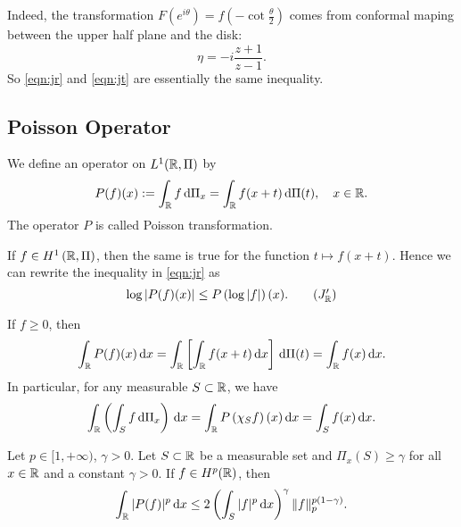 \begin{remark}
	Indeed, the transformation $\displaystyle F(e^{i\theta })=f\left( -\cot \frac{\theta }{2} \right) $ comes from conformal maping between the upper half plane and the disk:
	\[
	\eta = -i \frac{z+1}{z-1}.
	\]
	So \cref{eqn:jr} and \cref{eqn:jt} are essentially the same inequality.
\end{remark}

\subsection{Poisson Operator}
	We define an operator on $L^1(\mathbb{R},\Pi)$ by
	\[
	P(f)(x):=\int_{\mathbb{R}}f\,\mathrm{d} \Pi_x=\int_{\mathbb{R}}f(x+t)\,\mathrm{d} \Pi(t),\quad x\in \mathbb{R}.
	\] 
	The operator $P$ is called Poisson transformation.


If $f\in H^{1}\left( \mathbb{R},\Pi \right) $, then the same is true for the function $t\mapsto f(x+t)$. Hence we can rewrite the inequality in \cref{eqn:jr} as
\begin{equation}\label{eqn:jr'}
	 \log |P(f)(x) | \le P\left( \log |f| \right) (x). \tag{$J_{\R}'$} 
\end{equation}

If $f\ge 0$, then 
\begin{equation}\label{eqn:1}
\int_{\mathbb{R}}P(f)(x) \,\mathrm{d} x=\int_{\mathbb{R}}\left[ \int_{\mathbb{R}}f(x+t)\,\mathrm{d} x \right] \,\mathrm{d} \Pi(t)=\int_{\mathbb{R}}f(x) \,\mathrm{d} x.
\end{equation}
In particular, for any measurable $S\subset \mathbb{R}$, we have
\begin{equation}\label{eqn:2}
\int_{\mathbb{R}}\left( \int_{S}f\,\mathrm{d} \Pi_x \right) \,\mathrm{d} x= \int_{\mathbb{R}}P\left( \chi_S f \right) (x)\,\mathrm{d} x=\int_{S}f(x)\,\mathrm{d} x.
\end{equation} 


\begin{lemma} \label{lma:key}
	Let $p \in [1,+\infty)$, $\gamma>0$. Let $S\subset \mathbb{R}$ be a measurable set and $\Pi_x(S)\ge \gamma$ for all $x\in \mathbb{R}$ and a constant $\gamma>0$. If $f\in H^{p}(\mathbb{R})$, then
	\begin{equation}\label{eqn:key}
		\int_{\mathbb{R}}|P(f)|^{p}\,\mathrm{d} x\le 2\left(\int_S|f|^{p}\,\mathrm{d} x\right)^{\gamma}\|f\|_p^{p\left( 1-\gamma \right) }.
	\end{equation}
\end{lemma}

